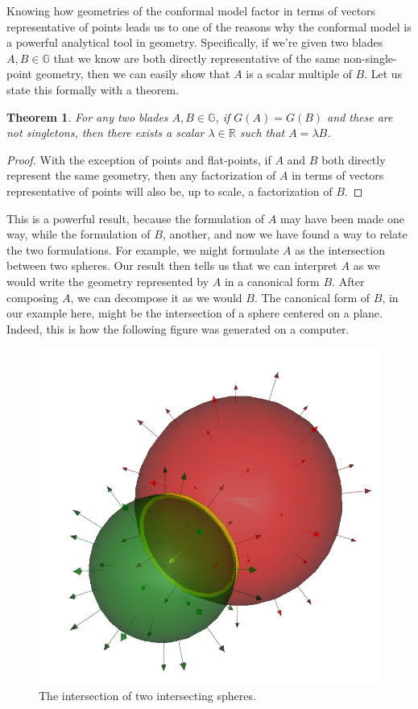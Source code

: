 \documentclass[12pt]{article}
\newcommand{\G}{\mathbb{G}}
\newcommand{\R}{\mathbb{R}}
\newtheorem{theorem}{Theorem}[section]
\begin{document}
Knowing how geometries of the conformal model factor in terms of vectors
representative of points leads us to one of the reasons why the conformal model
is a powerful analytical tool in geometry.  Specifically, if we're given two blades $A,B\in\G$ that
we know are both directly representative of the same non-single-point geometry, then we can easily show
that $A$ is a scalar multiple of $B$.  Let us state this formally with a theorem.
\begin{theorem}\label{thm_same_geos}
For any two blades $A,B\in\G$, if $G(A)=G(B)$ and these are not singletons,
then there exists a scalar $\lambda\in\R$ such that $A=\lambda B$.
\end{theorem}
\begin{proof}
With the exception of points and flat-points,
if $A$ and $B$ both directly represent the same geometry,
then any factorization of $A$ in terms of vectors representative of points will
also be, up to scale, a factorization of $B$.
\end{proof}
This is a powerful result, because the formulation
of $A$ may have been made one way, while the formulation of $B$, another, and now
we have found a way to relate the two formulations.  For example,
we might formulate $A$ as the intersection between two spheres.  Our result then tells us
that we can interpret $A$ as we would write the geometry represented by $A$ in a
canonical form $B$.  After composing $A$, we can decompose it as we would $B$.
The canonical form of $B$, in our example here, might be the intersection of a sphere centered on a plane.
Indeed, this is how the following figure was generated on a computer.
\begin{figure}[H]
\centering
\includegraphics[scale=0.3]{RealIntersectionOfTwoSpheresFigure}
\caption{The intersection of two intersecting spheres.}
\end{figure}
\end{document}
